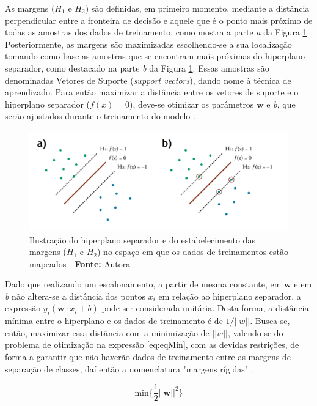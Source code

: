 As margens ($H_1$ e $H_2$) são definidas, em primeiro momento, mediante a distância perpendicular entre a fronteira de decisão e aquele que é o ponto mais próximo de todas as amostras dos dados de treinamento, como mostra a parte \textit{a} da Figura \ref{fig:marginSVM}. Posteriormente, as margens são maximizadas escolhendo-se a sua localização tomando como base as amostras que se encontram mais próximas do hiperplano separador, como destacado na parte \textit{b} da Figura \ref{fig:marginSVM}. Essas amostras são denominadas Vetores de Suporte (\textit{support vectors}), dando nome à técnica de aprendizado. Para então maximizar a distância entre os vetores de suporte e o hiperplano separador ($f(x) = 0$), deve-se otimizar os parâmetros $\boldsymbol{w}$ e \textit{b}, que serão ajustados durante o treinamento do modelo .

\begin{figure}[H]
 \centering
  \includegraphics[width=0.9\linewidth]{figuras/marginSVM.pdf}
  \caption{Ilustração do hiperplano separador e do estabelecimento das margens ($H_1$ e $H_2$) no espaço em que os dados de treinamentos estão mapeados - \textbf{Fonte:} Autora}
  \label{fig:marginSVM}
\end{figure}

Dado que realizando um escalonamento, a partir de mesma constante, em $\boldsymbol{w}$ e em \textit{b} não altera-se a distância dos pontos $x_i$ em relação ao hiperplano separador, a expressão $y_i(\boldsymbol{w} \cdot x_i + b)$ pode ser considerada unitária. Desta forma, a distância mínima entre o hiperplano e os dados de treinamento é de $1/||w||$. Busca-se, então, maximizar essa distância com a minimização de $||w||$, valendo-se do problema de otimização na expressão \ref{eq:eqMin}, com as devidas restrições, de forma a garantir que não haverão dados de treinamento entre as margens de separação de classes, daí então a nomenclatura "margens rígidas" .

\begin{equation}
\label{eq:eqMin}
  \text{min}\{\frac{1}{2}||\boldsymbol{w}||^2\}
\end{equation}

